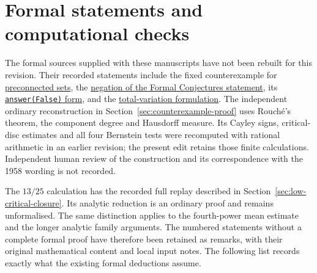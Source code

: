 \section{Formal statements and computational checks}\label{sec:verification-notes}

The formal sources supplied with these manuscripts have not been rebuilt
for this revision. Their recorded statements include the fixed
counterexample for
\href{https://github.com/wcook04/plectis-erdos/blob/7380b7871687b6bcc41ca0143c61f232e8af6500/lean/ErdosProblems/Erdos1041/Counterexample/HausdorffLength.lean\#L283}{preconnected sets},
the
\href{https://github.com/wcook04/plectis-erdos/blob/7380b7871687b6bcc41ca0143c61f232e8af6500/lean/ErdosProblems/Erdos1041/Counterexample/HausdorffLength.lean\#L407}{negation of the Formal Conjectures statement},
its
\href{https://github.com/wcook04/plectis-erdos/blob/7380b7871687b6bcc41ca0143c61f232e8af6500/lean/ErdosProblems/Erdos1041/Counterexample/HausdorffLength.lean\#L449}{\texttt{answer(False)} form},
and the
\href{https://github.com/wcook04/plectis-erdos/blob/f70679d47178bf1174309cb29f5b31748609cc04/lean/ErdosProblems/Erdos1041/Counterexample/CatalogueAdapter.lean\#L25}{total-variation formulation}.
The independent ordinary reconstruction in
Section~\ref{sec:counterexample-proof} uses Rouch\'e's theorem, the
component degree and Hausdorff measure. Its Cayley signs, critical-disc
estimates and all four Bernstein tests were recomputed with rational
arithmetic in an earlier revision; the present edit retains those
finite calculations. Independent human review of the construction and its
correspondence with the 1958 wording is not recorded.

The $13/25$ calculation has the recorded full replay described in
Section~\ref{sec:low-critical-closure}. Its analytic reduction is an
ordinary proof and remains unformalised. The same distinction applies
to the fourth-power mean estimate and the longer analytic family
arguments. The numbered statements without a complete formal proof
have therefore been retained as remarks, with their original
mathematical content and local input notes. The following list records
exactly what the existing formal deductions assume.

